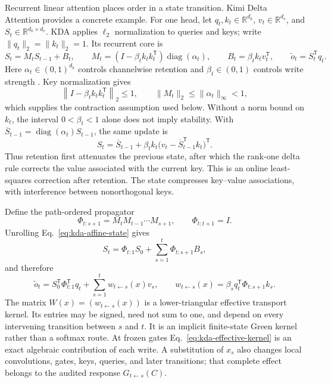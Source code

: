 \documentclass[10pt]{article}
\newcommand{\R}{\mathbb R}
\newcommand{\diag}{\operatorname{diag}}
\theoremstyle{definition}
\theoremstyle{remark}
\begin{document}
Recurrent linear attention places order in a state transition.  Kimi Delta Attention provides a
concrete example.  For one head, let $q_t,k_t\in\R^{d_k}$, $v_t\in\R^{d_v}$, and
$S_t\in\R^{d_k\times d_v}$.  KDA applies $\ell_2$ normalization to queries and keys; write
$\|q_t\|_2=\|k_t\|_2=1$.  Its recurrent core is
\begin{equation}
S_t=M_tS_{t-1}+B_t,
\qquad
M_t=(I-\beta_tk_tk_t^{\mathsf T})\diag(\alpha_t),
\qquad
B_t=\beta_tk_tv_t^{\mathsf T},
\qquad
\widetilde o_t=S_t^{\mathsf T}q_t.
\label{eq:kda-affine-state}
\end{equation}
Here $\alpha_t\in(0,1)^{d_k}$ controls channelwise retention and
$\beta_t\in(0,1)$ controls write strength \cite{kimilinear2025,kimik3}.  Key normalization gives
\begin{equation}
\left\|I-\beta_tk_tk_t^{\mathsf T}\right\|_2\leq1,
\qquad
\|M_t\|_2\leq\|\alpha_t\|_\infty<1,
\label{eq:kda-one-step-contraction}
\end{equation}
which supplies the contraction assumption used below.  Without a norm bound on $k_t$, the interval
$0<\beta_t<1$ alone does not imply stability.  With
$\overline S_{t-1}=\diag(\alpha_t)S_{t-1}$, the same update is
\begin{equation}
S_t=\overline S_{t-1}
+\beta_tk_t\bigl(v_t-\overline S_{t-1}^{\mathsf T}k_t\bigr)^{\mathsf T}.
\label{eq:kda-delta-correction}
\end{equation}
Thus retention first attenuates the previous state, after which the rank-one delta rule corrects the
value associated with the current key.  This is an online least-squares correction after retention.
The state compresses key--value associations, with interference between nonorthogonal keys.

Define the path-ordered propagator
\begin{equation}
\Phi_{t:s+1}=M_tM_{t-1}\cdots M_{s+1},
\qquad \Phi_{t:t+1}=I.
\label{eq:kda-propagator}
\end{equation}
Unrolling Eq.~\ref{eq:kda-affine-state} gives
\begin{equation}
S_t=\Phi_{t:1}S_0+\sum_{s=1}^{t}\Phi_{t:s+1}B_s,
\label{eq:kda-unrolled-state}
\end{equation}
and therefore
\begin{equation}
\widetilde o_t
=S_0^{\mathsf T}\Phi_{t:1}^{\mathsf T}q_t
+\sum_{s=1}^{t}w_{t\leftarrow s}(x)v_s,
\qquad
w_{t\leftarrow s}(x)
=\beta_s q_t^{\mathsf T}\Phi_{t:s+1}k_s.
\label{eq:kda-effective-kernel}
\end{equation}
The matrix $W(x)=(w_{t\leftarrow s}(x))$ is a lower-triangular effective transport kernel.  Its
entries may be signed, need not sum to one, and depend on every intervening transition between $s$
and $t$.  It is an implicit finite-state Green kernel rather than a softmax route.  At frozen gates
Eq.~\ref{eq:kda-effective-kernel} is an exact algebraic contribution of each write.  A substitution
of $x_s$ also changes local convolutions, gates, keys, queries, and later transitions; that complete
effect belongs to the audited response $G_{t\leftarrow s}(C)$.
\end{document}
